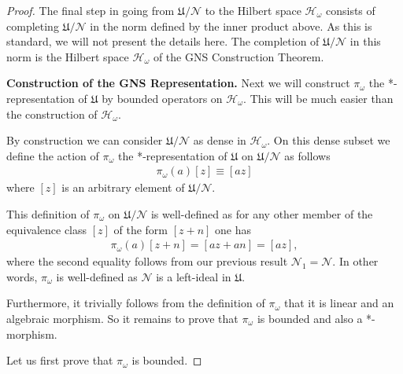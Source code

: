 \begin{proof}
The final step in going from $\mathfrak{U} / \mathcal{N}$ to the Hilbert space $\mathcal{H}_\omega$ consists of completing $\mathfrak{U} / \mathcal{N}$ in the norm defined by the inner product above. As this is standard, we will not present the details here. The completion of $\mathfrak{U} / \mathcal{N}$ in this norm is the Hilbert space $\mathcal{H}_\omega$ of the GNS Construction Theorem.

\noindent\textbf{Construction of the GNS Representation.}
Next we will construct $\pi_\omega$ the *-representation of $\mathfrak{U}$ by bounded operators on $\mathcal{H}_\omega$. This will be much easier than the construction of $\mathcal{H}_\omega$.

By construction we can consider $\mathfrak{U} / \mathcal{N}$ as dense in $\mathcal{H}_\omega$. On this dense subset we define the action of $\pi_\omega$ the *-representation of $\mathfrak{U}$ on $\mathfrak{U} / \mathcal{N}$ as follows
\begin{align}
    \pi_\omega(a)[z] \equiv [az]
\end{align}
where $[z]$ is an arbitrary element of $\mathfrak{U} / \mathcal{N}$.

This definition of $\pi_\omega$ on $\mathfrak{U} / \mathcal{N}$ is well-defined as for any other member of the equivalence class $[z]$ of the form $[z + n]$ one has
\begin{align}
    \pi_\omega(a)[z + n] = [az + an] = [az],
\end{align}
where the second equality follows from our previous result $\mathcal{N}_1 = \mathcal{N}$. In other words, $\pi_\omega$ is well-defined as $\mathcal{N}$ is a left-ideal in $\mathfrak{U}$.

Furthermore, it trivially follows from the definition of $\pi_\omega$ that it is linear and an algebraic morphism. So it remains to prove that $\pi_\omega$ is bounded and also a *-morphism.

Let us first prove that $\pi_\omega$ is bounded.


\end{proof}
